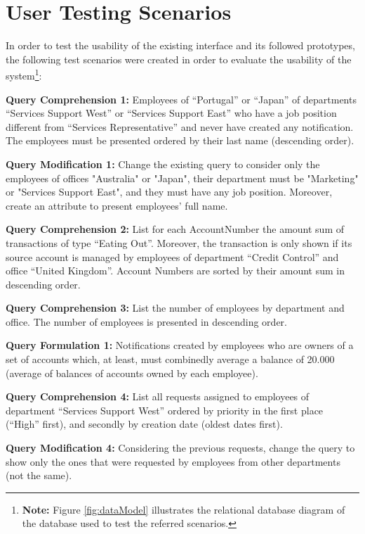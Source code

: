 \chapter{User Testing Scenarios}
\label{app:user_testing_scenarios}

In order to test the usability of the existing interface and its followed prototypes, the following test scenarios were created in order to evaluate the usability of the system\footnote{\textbf{Note: }Figure \ref{fig:dataModel} illustrates the relational database diagram of the database used to test the referred scenarios.}:

\medskip

\textbf{Query Comprehension 1: }Employees of “Portugal” or “Japan” of departments “Services Support West” or “Services Support East” who have a job position different from “Services Representative” and never have created any notification. The employees must be presented ordered by their last name (descending order).

\medskip

\textbf{Query Modification 1: }Change the existing query to consider only the employees of offices "Australia" or "Japan", their department must be "Marketing" or "Services Support East", and they must have any job position. Moreover, create an attribute to present employees’ full name.

\medskip

\textbf{Query Comprehension 2: }List for each AccountNumber the amount sum of transactions of type “Eating Out”. Moreover, the transaction is only shown if its source account is managed by employees of department “Credit Control” and office “United Kingdom”. Account Numbers are sorted by their amount sum in descending order.

\medskip

\textbf{Query Comprehension 3: }List the number of employees by department and office. The number of employees is presented in descending order.

\medskip

\textbf{Query Formulation 1: }Notifications created by employees who are owners of a set of accounts which, at least, must combinedly average a balance of 20.000 (average of balances of accounts owned by each employee).

\medskip

\textbf{Query Comprehension 4: }List all requests assigned to employees of department “Services Support West” ordered by priority in the first place (“High” first), and secondly by creation date (oldest dates first).

\medskip

\textbf{Query Modification 4: }Considering the previous requests, change the query to show only the ones that were requested by employees from other departments (not the same).


